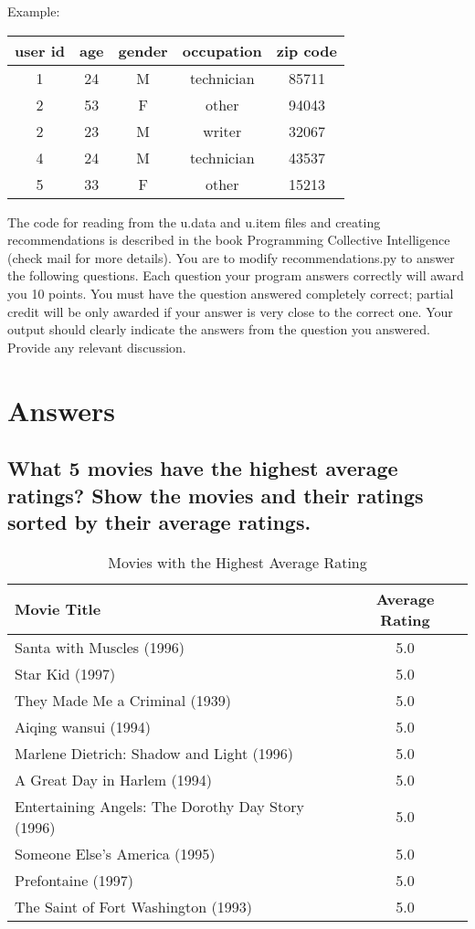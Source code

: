 \documentclass{article}
\begin{document}
Example: \\

\begin{table}[!h]
\centering
\begin{tabular}{c c c c c}
user id & age &  gender & occupation & zip code \\
\hline
1 & 24 & M & technician & 85711 \\
2 & 53 & F & other & 94043 \\
2 & 23 & M & writer & 32067 \\
4 & 24 & M & technician & 43537 \\
5 & 33 & F & other & 15213 \\
\end{tabular}
\end{table}

The code for reading from the u.data and u.item files and creating recommendations is described in the book Programming Collective Intelligence (check mail for more details). You are to modify recommendations.py to answer the following questions. Each question your program answers correctly will award you 10 points. You must have the question answered completely correct; partial credit will be only awarded if your answer is very close to the correct one. Your output should clearly indicate the answers from the question you answered. Provide any relevant discussion.

\newpage
\listoftables
\lstlistoflistings

\newpage
\section*{Answers}
\renewcommand\thesubsection{\arabic{subsection}}
\subsection{What 5 movies have the highest average ratings? Show the movies and their ratings sorted by their average ratings.}

\begin{table}[!h]
\centering
\begin{tabular}{l c}
Movie Title & Average Rating \\
\hline
Santa with Muscles (1996) & 5.0  \\
Star Kid (1997) & 5.0  \\
They Made Me a Criminal (1939) & 5.0  \\
Aiqing wansui (1994) & 5.0  \\
Marlene Dietrich: Shadow and Light (1996) & 5.0  \\
A Great Day in Harlem (1994) & 5.0  \\
Entertaining Angels: The Dorothy Day Story (1996) & 5.0  \\
Someone Else's America (1995) & 5.0  \\
Prefontaine (1997) & 5.0  \\
The Saint of Fort Washington (1993) & 5.0  \\
\hline
\end{tabular}
\caption{Movies with the Highest Average Rating}
\end{table}
\end{document}
